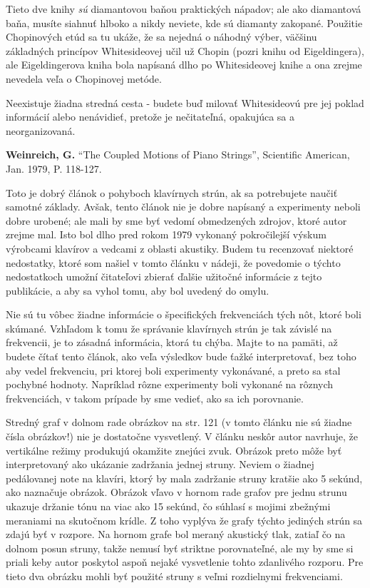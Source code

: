 \documentclass[11pt,a4paper]{book}
\begin{document}
Tieto dve knihy \textit{sú} diamantovou baňou praktických nápadov; ale ako diamantová baňa, musíte siahnuť hlboko a nikdy neviete, kde sú diamanty zakopané. Použitie Chopinových etúd sa tu ukáže, že sa nejedná o náhodný výber, väčšinu základných princípov Whitesideovej učil už Chopin (pozri knihu od Eigeldingera), ale Eigeldingerova kniha bola napísaná dlho po Whitesideovej knihe a ona zrejme nevedela veľa o Chopinovej metóde. 

Neexistuje žiadna stredná cesta - budete buď milovať Whitesideovú pre jej poklad informácií alebo nenávidieť, pretože je nečitateľná, opakujúca sa a neorganizovaná.

\textbf{Weinreich, G.} “The Coupled Motions of Piano Strings”, Scientific American, Jan. 1979, P. 118-127. 

Toto je dobrý článok o pohyboch klavírnych strún, ak sa potrebujete naučiť samotné základy. Avšak, tento článok nie je dobre napísaný a experimenty neboli dobre urobené; ale mali by sme byť vedomí obmedzených zdrojov, ktoré autor zrejme mal. Isto bol dlho pred rokom 1979 vykonaný pokročilejší výskum výrobcami klavírov a vedcami z oblasti akustiky. Budem tu recenzovať niektoré nedostatky, ktoré som našiel v tomto článku v nádeji, že povedomie o týchto nedostatkoch umožní čitateľovi zbierať ďalšie užitočné informácie z tejto publikácie, a aby sa  vyhol tomu, aby bol uvedený do omylu. 

Nie sú tu vôbec žiadne informácie o špecifických frekvenciách tých nôt, ktoré boli skúmané. Vzhľadom k tomu že správanie klavírnych strún je tak závislé na frekvencii, je to zásadná informácia, ktorá tu chýba. Majte to na pamäti, až budete čítať tento článok, ako veľa výsledkov bude ťažké interpretovať, bez toho aby vedel frekvenciu, pri ktorej boli experimenty vykonávané, a preto sa stal pochybné hodnoty. Napríklad rôzne experimenty boli vykonané na rôznych frekvenciách, v takom prípade by sme vedieť, ako sa ich porovnanie. 

Stredný graf v dolnom rade obrázkov na str. 121 (v tomto článku nie sú žiadne čísla obrázkov!) nie je dostatočne vysvetlený. V článku neskôr autor navrhuje, že vertikálne režimy produkujú okamžite znejúci zvuk. Obrázok preto môže byť interpretovaný ako ukázanie zadržania jednej struny. Neviem o žiadnej pedálovanej note na klavíri, ktorý by mala zadržanie struny kratšie ako 5 sekúnd, ako naznačuje obrázok. Obrázok vľavo v hornom rade grafov pre jednu strunu ukazuje držanie tónu na viac ako 15 sekúnd, čo súhlasí s mojimi zbežnými meraniami na skutočnom krídle. Z toho vyplýva že grafy týchto jediných strún sa zdajú byť v rozpore. Na hornom grafe bol meraný akustický tlak, zatiaľ čo na dolnom posun struny, takže nemusí byť striktne porovnateľné, ale my by sme si priali keby autor poskytol aspoň nejaké vysvetlenie tohto zdanlivého rozporu. Pre tieto dva obrázku mohli byť použité struny s veľmi rozdielnymi frekvenciami. 
\end{document}
